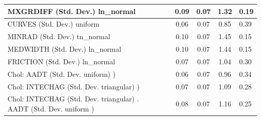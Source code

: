 \begin{table}
\begin{center}
\begin{tabular}{|l|l|c|c|c|l|}
			MXGRDIFF (Std. Dev.) ln_normal &  & 0.09 & 0.07 & 1.32 & 0.19 \\
			\hline
			CURVES (Std. Dev.) uniform &  & 0.06 & 0.07 & 0.85 & 0.39 \\
			\hline
			MINRAD (Std. Dev.) tn_normal &  & 0.10 & 0.07 & 1.45 & 0.15 \\
			\hline
			MEDWIDTH (Std. Dev.) ln_normal &  & 0.10 & 0.07 & 1.44 & 0.15 \\
			\hline
			FRICTION (Std. Dev.) ln_normal &  & 0.07 & 0.07 & 1.04 & 0.30 \\
			\hline
			 Chol: AADT (Std. Dev. uniform) ) &  & 0.06 & 0.07 & 0.96 & 0.34 \\
			\hline
			 Chol: INTECHAG (Std. Dev. triangular) ) &  & 0.07 & 0.07 & 1.09 & 0.28 \\
			\hline
			 Chol: INTECHAG (Std. Dev. triangular) . AADT (Std. Dev.   uniform ) &  & 0.08 & 0.07 & 1.16 & 0.25 \\
			\hline
		\end{tabular}
	\end{center}
\end{table}